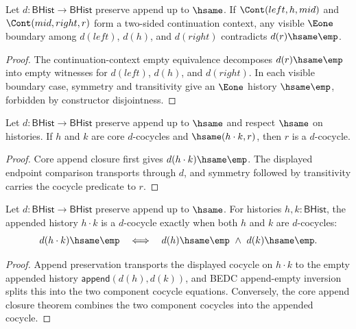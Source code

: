 \begin{theorem}
\label{thm:cohomology-cocycle-continuation-context-e1-boundary-empty-absurd}
Let $d:\mathsf{BHist}\to\mathsf{BHist}$ preserve append up to $\hsame$. If
$\Cont(left,h,mid)$ and $\Cont(mid,right,r)$ form a two-sided continuation
context, any visible $\Eone$ boundary among $d(left)$, $d(h)$, and $d(right)$
contradicts $d(r)\hsame\emp$.
\end{theorem}
\begin{proof}
The continuation-context empty equivalence decomposes $d(r)\hsame\emp$ into
empty witnesses for $d(left)$, $d(h)$, and $d(right)$. In each visible boundary
case, symmetry and transitivity give an $\Eone$ history $\hsame\emp$, forbidden
by constructor disjointness.
\end{proof}

\begin{theorem}
\label{thm:cohomology-cocycle-core-append-hsame-transport}
Let $d:\mathsf{BHist}\to\mathsf{BHist}$ preserve append up to $\hsame$ and
respect $\hsame$ on histories. If $h$ and $k$ are core $d$-cocycles and
$\hsame(h\cdot k,r)$, then $r$ is a $d$-cocycle.
\end{theorem}
\begin{proof}
Core append closure first gives $d(h\cdot k)\hsame\emp$. The displayed
endpoint comparison transports through $d$, and symmetry followed by
transitivity carries the cocycle predicate to $r$.
\end{proof}

\begin{theorem}
\label{thm:cohomology-cocycle-append-empty-iff}
Let $d:\mathsf{BHist}\to\mathsf{BHist}$ preserve append up to $\hsame$. For
histories $h,k:\mathsf{BHist}$, the appended history $h\cdot k$ is a
$d$-cocycle exactly when both $h$ and $k$ are $d$-cocycles:
$$
d(h\cdot k)\hsame\emp
\quad\Longleftrightarrow\quad
d(h)\hsame\emp\ \wedge\ d(k)\hsame\emp.
$$
\end{theorem}
\begin{proof}
Append preservation transports the displayed cocycle on $h\cdot k$ to the
empty appended history $\mathsf{append}(d(h),d(k))$, and BEDC
append-empty inversion splits this into the two component cocycle equations.
Conversely, the core append closure theorem combines the two component
cocycles into the appended cocycle.
\end{proof}

